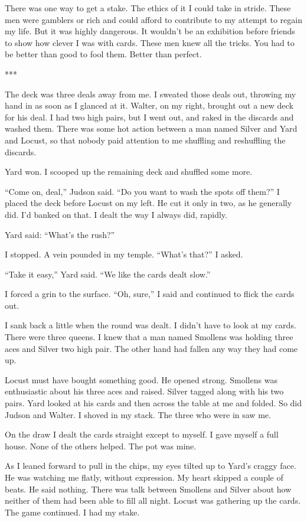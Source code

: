 \documentclass{novel}
\begin{document}
{There was one way to get a stake. The ethics of it I could take in stride. These men were gamblers or rich and could afford to contribute to my attempt to regain my life. But it was highly dangerous. It wouldn’t be an exhibition before friends to show how clever I was with cards. These men knew all the tricks. You had to be better than good to fool them. Better than perfect.

***

The deck was three deals away from me. I sweated those deals out, throwing my hand in as soon as I glanced at it. Walter, on my right, brought out a new deck for his deal. I had two high pairs, but I went out, and raked in the discards and washed them. There was some hot action between a man named Silver and Yard and Locust, so that nobody paid attention to me shuffling and reshuffling the discards.

Yard won. I scooped up the remaining deck and shuffled some more.

“Come on, deal,” Judson said. “Do you want to wash the spots off them?” I placed the deck before Locust on my left. He cut it only in two, as he generally did. I’d banked on that. I dealt the way I always did, rapidly.

Yard said: “What’s the rush?”

I stopped. A vein pounded in my temple. “What’s that?” I asked.

“Take it easy,” Yard said. “We like the cards dealt slow.”

I forced a grin to the surface. “Oh, sure,” I said and continued to flick the cards out.

I sank back a little when the round was dealt. I didn’t have to look at my cards. There were three queens. I knew that a man named Smollens was holding three aces and Silver two high pair. The other hand had fallen any way they had come up.

Locust must have bought something good. He opened strong. Smollens was enthusiastic about his three aces and raised. Silver tagged along with his two pairs. Yard looked at his cards and then across the table at me and folded. So did Judson and Walter. I shoved in my stack. The three who were in saw me.

On the draw I dealt the cards straight except to myself. I gave myself a full house. None of the others helped. The pot was mine.

As I leaned forward to pull in the chips, my eyes tilted up to Yard’s craggy face. He was watching me flatly, without expression. My heart skipped a couple of beats. He said nothing. There was talk between Smollens and Silver about how neither of them had been able to fill all night. Locust was gathering up the cards. The game continued. I had my stake.

}
\end{document}
